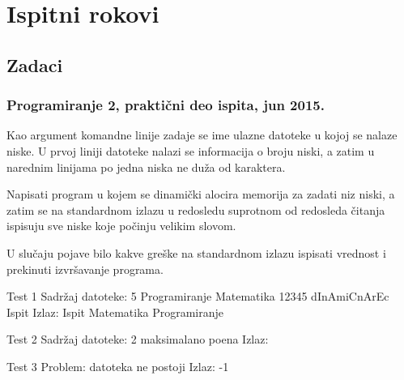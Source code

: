 
\chapter{Ispitni rokovi}

\section{Zadaci}

\subsection*{Programiranje 2, praktični deo ispita, jun 2015.}


\begin{Exercise}[label=901]

Kao argument komandne linije zadaje se ime ulazne datoteke u kojoj se nalaze niske. U prvoj liniji datoteke nalazi se informacija o broju niski, a zatim u narednim linijama po jedna niska ne duža od  karaktera.
  
Napisati program u kojem se dinamički alocira memorija za zadati niz niski, a zatim se na standardnom izlazu u redosledu suprotnom od redosleda čitanja ispisuju sve niske koje počinju velikim slovom. 

U slučaju pojave bilo kakve greške na standardnom izlazu ispisati vrednost  i prekinuti izvršavanje programa.

\begin{minitest}
\begin{test}{Test 1}
Sadržaj datoteke:  
 5                             
 Programiranje	                               
 Matematika		                         
 12345
 dInAmiCnArEc
 Ispit
Izlaz:           
 Ispit                                                                
 Matematika
 Programiranje
\end{test}
\end{minitest}
\begin{minitest}
\begin{test}{Test 2}
Sadržaj datoteke:               
  2                                             
  maksimalano               
  poena
Izlaz:         
\end{test}
\end{minitest}
\begin{minitest}
\begin{test}{Test 3}
Problem: 
  datoteka 
   ne postoji
Izlaz:    
  -1       
\end{test}
\end{minitest}


\end{Exercise}
\begin{Answer}[ref=901]
\end{Answer}


